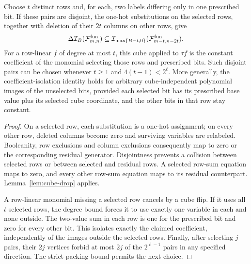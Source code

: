 \begin{lemma}\label{lem:row-cube}
Choose \(t\) distinct rows and, for each, two labels differing only in
one prescribed bit. If these pairs are disjoint, the one-hot substitutions
on the selected rows, together with deletion of their \(2t\) columns on
other rows, give
\[
 \Delta\mathcal I_B(\mathcal F^{\mathrm{fun}}_{m,n})
 \subseteq\mathcal I_{\max\{B-t,0\}}
       (\mathcal F^{\mathrm{fun}}_{m-t,n-2t}).
\]
For a row-linear \(f\) of degree at most \(t\), this cube applied to
\(\tau f\) is the constant coefficient of the monomial selecting those
rows and prescribed bits. Such disjoint pairs can be chosen whenever
\(t\ge1\) and \(4(t-1)<2^\ell\).
More generally, the coefficient-isolation identity holds for arbitrary
cube-independent polynomial images of the unselected bits, provided each
selected bit has its prescribed base value plus its selected cube coordinate,
and the other bits in that row stay constant.
\end{lemma}
\begin{proof}
On a selected row, each substitution is a one-hot assignment; on every
other row, deleted columns become zero and surviving variables are relabeled.
Booleanity, row exclusions and column exclusions consequently map to zero
or the corresponding residual generator. Disjointness prevents a collision
between selected rows or between selected and residual rows. A selected
row-sum equation maps to zero, and every other row-sum equation maps to
its residual counterpart. Lemma~\ref{lem:cube-drop} applies.

A row-linear monomial missing a selected row cancels by a cube flip. If it
uses all \(t\) selected rows, the degree bound forces it to use exactly
one variable in each and none outside. The two-value sum in each row is
one for the prescribed bit and zero for every other bit. This isolates
exactly the claimed coefficient, independently of the images outside the
selected rows. Finally, after selecting \(j\) pairs, their \(2j\) vertices
forbid at most \(2j\) of the \(2^{\ell-1}\) pairs in any specified direction.
The strict packing bound permits the next choice.
\end{proof}

